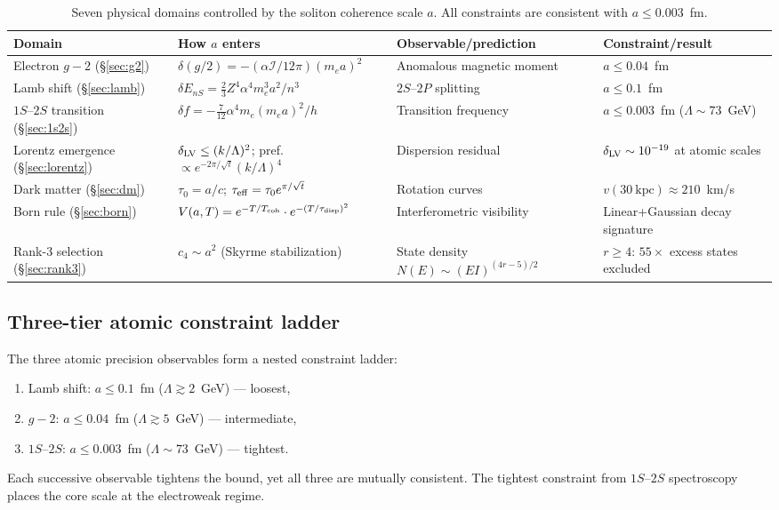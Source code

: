 ﻿\documentclass[a4paper,12pt]{article}
\begin{document}
\begin{table}[H]
\centering
\caption{Seven physical domains controlled by the soliton coherence
  scale $a$.  All constraints are consistent with $a\leq 0.003$~fm.}
\label{tab:seven}

\begin{tabular}{llll}
Domain & How $a$ enters & Observable/prediction & Constraint/result \\
\hline
Electron $g{-}2$ (§\ref{sec:g2})
  & $\delta(g/2)=-(\alpha\mathcal{I}/12\pi)(m_ea)^2$
  & Anomalous magnetic moment
  & $a\leq 0.04$~fm \\
Lamb shift (§\ref{sec:lamb})
  & $\delta E_{nS}=\tfrac{2}{3}Z^4\alpha^4 m_e^3 a^2/n^3$
  & $2S$--$2P$ splitting
  & $a\leq 0.1$~fm \\
$1S$--$2S$ transition (§\ref{sec:1s2s})
  & $\delta f=-\tfrac{7}{12}\alpha^4 m_e(m_ea)^2/h$
  & Transition frequency
  & $a\leq 0.003$~fm ($\Lambda\sim 73$~GeV) \\
Lorentz emergence (§\ref{sec:lorentz})
  & $\delta_{\rm LV}\leq(k/\Lambda)^2$; pref.\ $\propto e^{-2\pi/\sqrt{t}}(k/\Lambda)^4$
  & Dispersion residual
  & $\delta_{\rm LV}\sim 10^{-19}$ at atomic scales \\
Dark matter (§\ref{sec:dm})
  & $\tau_0=a/c$; $\tau_{\rm eff}=\tau_0 e^{\pi/\sqrt{t}}$
  & Rotation curves
  & $v(30~\text{kpc})\approx 210$~km/s \\
Born rule (§\ref{sec:born})
  & $V(a,T)=e^{-T/T_{\rm coh}}\cdot e^{-(T/\tau_{\rm disp})^2}$
  & Interferometric visibility
  & Linear+Gaussian decay signature \\
Rank-3 selection (§\ref{sec:rank3})
  & $c_4\sim a^2$ (Skyrme stabilization)
  & State density $N(E)\sim(EI)^{(4r-5)/2}$
  & $r\geq 4$: $55\times$ excess states excluded \\
\end{tabular}

\end{table}

\subsection{Three-tier atomic constraint ladder}

The three atomic precision observables form a nested constraint ladder:
\begin{enumerate}
  \item Lamb shift: $a\leq 0.1$~fm ($\Lambda\gtrsim 2$~GeV) --- loosest,
  \item $g{-}2$: $a\leq 0.04$~fm ($\Lambda\gtrsim 5$~GeV) --- intermediate,
  \item $1S$--$2S$: $a\leq 0.003$~fm ($\Lambda\sim 73$~GeV) --- tightest.
\end{enumerate}
Each successive observable tightens the bound,
yet all three are mutually consistent.  The tightest constraint from
$1S$--$2S$ spectroscopy places the core scale at the electroweak regime.
\end{document}
